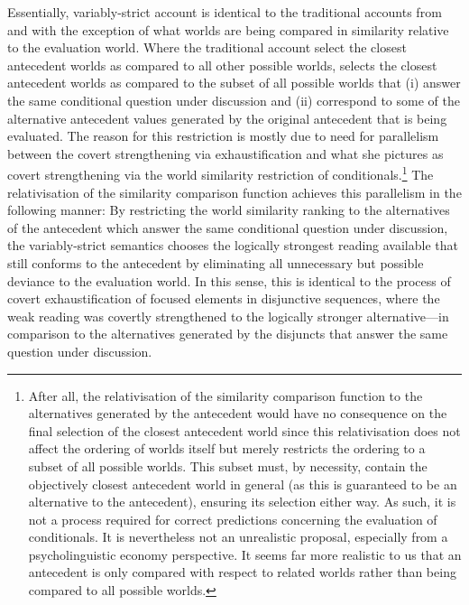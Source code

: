 Essentially,  variably-strict account is identical to the traditional accounts from \textcite{Stalnaker1968} and \textcite{Lewis1973} with the exception of what worlds are being compared in similarity relative to the evaluation world. Where the traditional account select the closest antecedent worlds as compared to all other possible worlds, \textcite{Ippolito2020} selects the closest antecedent worlds as compared to the subset of all possible worlds that (i) answer the same conditional question under discussion and (ii) correspond to some of the alternative antecedent values generated by the original antecedent that is being evaluated. The reason for this restriction is mostly due to  need for parallelism between the covert strengthening via exhaustification and what she pictures as covert strengthening via the world similarity restriction of conditionals.\footnote{After all, the relativisation of the similarity comparison function to the alternatives generated by the antecedent would have no consequence on the final selection of the closest antecedent world since this relativisation does not affect the ordering of worlds itself but merely restricts the ordering to a subset of all possible worlds. This subset must, by necessity, contain the objectively closest antecedent world in general (as this is guaranteed to be an alternative to the antecedent), ensuring its selection either way. As such, it is not a process required for correct predictions concerning the evaluation of conditionals. It is nevertheless not an unrealistic proposal, especially from a psycholinguistic economy perspective. It seems far more realistic to us that an antecedent is only compared with respect to related worlds rather than being compared to all possible worlds.} The relativisation of the similarity comparison function achieves this parallelism in the following manner: By restricting the world similarity ranking to the alternatives of the antecedent which answer the same conditional question under discussion, the variably-strict semantics chooses the logically strongest reading available that still conforms to the antecedent by eliminating all unnecessary but possible deviance to the evaluation world. In this sense, this is identical to the process of covert exhaustification of focused elements in disjunctive sequences, where the weak reading was covertly strengthened to the logically stronger alternative---in comparison to the alternatives generated by the disjuncts that answer the same question under discussion.

